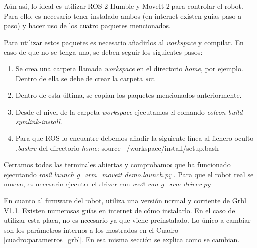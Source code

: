 Aún así, lo ideal es utilizar ROS 2 Humble y MoveIt 2 para controlar el robot. Para ello, es necesario tener instalado 
ambos (en internet existen guías paso a paso) y hacer uso de los cuatro paquetes mencionados.

\newpage
Para utilizar estos paquetes es necesario añadirlos al \textit{workspace} y compilar. En caso de que no se tenga uno, 
se deben seguir los siguientes pasos: 
\begin{enumerate}
\item Se crea una carpeta llamada \textit{workspace} en el directorio \textit{home}, por ejemplo. Dentro de ella 
se debe de crear la carpeta \textit{src}. 
\item Dentro de esta última, se copian los paquetes mencionados anteriormente.
\item Desde el nivel de la carpeta \textit{workspace} ejecutamos el comando \textit{colcon build --symlink-install}.
\item Para que ROS lo encuentre debemos añadir la siguiente línea al fichero oculto \textit{.bashrc} del directorio \textit{home}:
source ~/workspace/install/setup.bash

\end{enumerate}
Cerramos todas las terminales abiertas y comprobamos que ha funcionado ejecutando \textit{ros2 launch g\_arm\_moveit demo.launch.py} . Para que el 
robot real se mueva, es necesario ejecutar el driver con \textit{ros2 run g\_arm driver.py} .


En cuanto al firmware del robot, utiliza una versión normal y corriente de Grbl V1.1. Existen numerosas guías en internet de 
cómo instalarlo. En el caso de utilizar esta placa, no es necesario ya que viene preinstalado. Lo único a cambiar son los 
parámetros internos a los mostrados en el Cuadro \ref{cuadro:parametros_grbl}. En esa misma sección se explica como se cambian.

